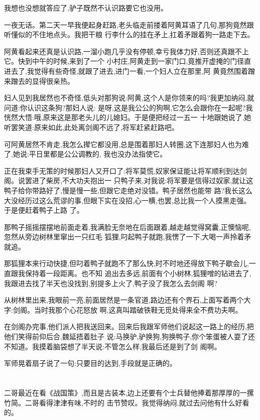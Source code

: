 ﻿\documentclass[12pt,twocolumn]{article}
\begin{document}
我想也没想就答应了,驴子既然不认识路要它也没用。

一夜无话。第二天一早我便起身赶路,老头临走前搂着阿黄耳语了几句,那狗竟然跟听懂似的不住地点头。我把干粮
行李什么的挂在矛上,扛着矛跟着狗一路走下去。

阿黄看起来还真是认识路,一溜小跑几乎没有停顿,幸亏我体力好,否则还真跟不上它。快到中午的时候,来到了一个
小村庄,阿黄走到一家门口,竟推开虚掩的门径直进去了,我觉得有些奇怪,就跟了进去,进门一看,一个妇人立在那里,阿
黄竟然围着蹭来蹭去的显得很亲热。

妇人见到我居然也不奇怪,低头对那狗说:阿黄,这个人是你领来的吗?我更加纳闷,就问道:你认识这条狗?那妇人说:
是呀,这是我公公的狗啊,它怎么会跟你在一起呢?我恍然大悟:哦,原来这是那老头儿的儿媳妇。于是便把经过一五一
十地跟她说了,她听罢笑道:原来如此,此处离剑阁不远了,将军赶紧赶路吧。

可阿黄居然不肯走,我怎么撵它都没用,总是围着那妇人转圈,这下连那妇人也为难了,她说:平日里都是公公调教的,
我也没办法指使它。

正在我束手无策的时候那妇人又开口了:将军莫慌,奴家保证能让将军顺利到达剑阁。说罢进了柴房,不大功夫抱出一
只鸭子来,对我说:将军要是信得过奴家,就让这鸭子给你带路好了,慢是慢一些,但跟它走绝对没错。鸭子居然也能带
路?我长这么大没经历过这么荒谬的事,但眼下实在没招,心一横,也罢,总比我一个人摸黑走强。于是便赶着鸭子上路
了。

那鸭子摇摇摆摆地前面走着,我满脸无奈地在后面跟着,越走越觉得窝囊,正懊恼呢,忽然从旁边树林里窜出一只红毛
狐狸,叼起鸭子就跑,我愣了一下,大喝一声拎着矛就追。

那狐狸本来行动快捷,但叼着鸭子就跑不了那么快,时不时地还得放下鸭子歇会儿,一直跟我保持着一段距离。也不知
追出去多远,前面有个小树林,狐狸噌的钻进去了,我跟进去找了半天也没找到,别提多上火了,鸭子没了我怎么去剑阁
啊?

从树林里出来,我眼前一亮,前面居然是一条官道,路边还有个界石,上面写着两个大字:剑阁。当时我那个心花怒放
啊,这真叫踏破铁鞋无觅处得来全不费功夫啊。

在剑阁办完事,他们派人把我送回来。回来后我跟军师他们说起这一路上的经历,把他们笑得前仰后合,魏延捂着肚子
说:马换驴,驴换狗,狗换鸭子,你个笨蛋被人耍了还不知道。我摸着脑袋想了半天说:不管怎么样,我最后还是到了剑
阁啊。

军师晃着扇子说了一句:只要目的达到,手段就是正确的。

\section{}

二哥最近在看《战国策》,而且是古装本,边上还要有个士兵替他捧着那厚厚的一摞竹简。二哥看得津津有味,不时的
击节赞叹。我觉得纳闷,就过去问他有什么好看的。
\end{document}
